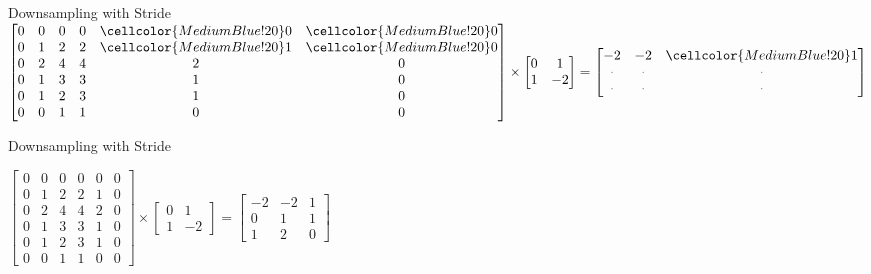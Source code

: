 \documentclass[aspectratio=169,xcolor=dvipsnames,svgnames,x11names,fleqn]{beamer}
\begin{document}
\begin{frame}[fragile]{Downsampling with Stride}
\centering
\vspace{0.5cm}
\renewcommand{\arraystretch}{1.2}
$ \begin{bmatrix}
    0 & 0 & 0 & 0 & \cellcolor{MediumBlue!20}0 & \cellcolor{MediumBlue!20}0 \\
    0 & 1 & 2 & 2 & \cellcolor{MediumBlue!20}1 & \cellcolor{MediumBlue!20}0 \\
    0 & 2 & 4 & 4 & 2 & 0 \\
    0 & 1 & 3 & 3 & 1 & 0 \\
    0 & 1 & 2 & 3 & 1 & 0 \\
    0 & 0 & 1 & 1 & 0 & 0
    \end{bmatrix} \times \begin{bmatrix} 0 & 1 \\ 1 & -2 \end{bmatrix} =   
    \begin{bmatrix} 
    -2 & -2 & \cellcolor{MediumBlue!20} 1 \\ 
    \textcolor{gray}{\cdot} & \textcolor{gray}{\cdot} & \textcolor{gray}{\cdot} \\ 
    \textcolor{gray}{\cdot} & \textcolor{gray}{\cdot} & \textcolor{gray}{\cdot} 
    \end{bmatrix} $
\end{frame}  
        
\begin{frame}[fragile]{Downsampling with Stride}
\centering
\vspace{0.5cm}
\begin{tcolorbox}[colback=white, colframe=gray!20, arc=2mm]
\centering
\renewcommand{\arraystretch}{1.2}
$ \begin{bmatrix}
    0 & 0 & 0 & 0 & 0 & 0 \\
    0 & 1 & 2 & 2 & 1 & 0 \\
    0 & 2 & 4 & 4 & 2 & 0 \\
    0 & 1 & 3 & 3 & 1 & 0 \\
    0 & 1 & 2 & 3 & 1 & 0 \\
    0 & 0 & 1 & 1 & 0 & 0
    \end{bmatrix} \times \begin{bmatrix} 0 & 1 \\ 1 & -2 \end{bmatrix} =   
    \begin{bmatrix} 
    -2 & -2 & 1 \\ 
    0 & 1 & 1 \\ 
    1 & 2 & 0 
    \end{bmatrix} $
\end{tcolorbox}
\end{frame}  
\end{document}
